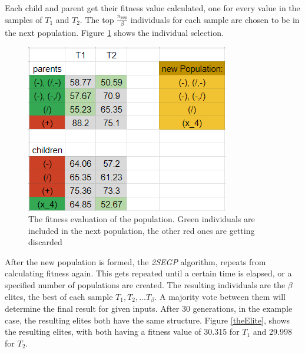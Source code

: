 \documentclass[tikz, runningheads]{llncs}
\begin{document}
Each child and parent get their fitness value calculated, one for every value in the samples of $T_1$ and $T_2$. The top $\frac{n_{pop}}{\beta}$
individuals for each sample are chosen to be in the next population. Figure \ref{evalImage} shows the individual selection.
\begin{figure}[h]
	\centering
	\includegraphics[scale=0.5]{Images/fitnessEval.PNG}
	\caption{The fitness evaluation of the population. Green individuals are included in the next population, 
	the other red ones are getting discarded} \label{evalImage}
\end{figure}

After the new population is formed, the \textit{2SEGP} algorithm, repeats from calculating fitness again. 
This gets repeated until a certain time is elapsed, or a specified number of populations are created.
The resulting individuals are the $\beta$ elites, the best of each sample $T_1, T_2, ... T_{\beta}$.
A majority vote between them will determine the final result for given inputs. 
After 30 generations, in the example case, the resulting elites both have the same structure.
Figure \ref{theElite}, shows the resulting elites, with both having a fitness value of 30.315 for 
$T_1$ and 29.998 for $T_2$. 
\end{document}
